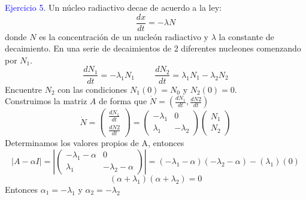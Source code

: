 \textcolor{blue}{Ejercicio 5.}
Un núcleo radiactivo decae de acuerdo a la ley:
\begin{equation*}
    \frac{dx}{dt}=-\lambda N
\end{equation*}
donde $N$ es la concentración de un nucleón radiactivo y $\lambda$ la constante de decaimiento. En una serie de decaimientos de 2 diferentes nucleones comenzando por $N_{1}$.
\begin{equation*}
    \frac{dN_{1}}{dt}=-\lambda_{1}N_{1} \hspace{1cm} \frac{dN_{2}}{dt}=\lambda_{1}N_{1}-\lambda_{2}N_{2}
\end{equation*}
Encuentre $N_{2}$ con las condiciones $N_{1}(0)=N_{0}$ y $N_{2}(0)=0$. \\

Construimos la matriz $A$ de forma que $\dot N=(\frac{dN_{1}}{dt},\frac{dN{2}}{dt})$
\begin{equation*}
\dot N =
    \begin{pmatrix}
    \frac{dN_{1}}{dt} \\
    \frac{dN{2}}{dt}
    \end{pmatrix}
    =
    \begin{pmatrix}
    -\lambda_{1} & 0 \\
    \lambda_{1} & -\lambda_{2}
    \end{pmatrix}
    \begin{pmatrix}
    N_{1} \\
    N_{2}
    \end{pmatrix}
\end{equation*}
Determinamos los valores propios de A, entonces
\begin{equation*}
     |A - \alpha I| = 
     \left|\begin{pmatrix}
     -\lambda_{1} - \alpha & 0 \\
    \lambda_{1} & -\lambda_{2} - \alpha
     \end{pmatrix}\right |
     =(-\lambda_{1} - \alpha )(-\lambda_{2} - \alpha)-(\lambda_{1})(0)
\end{equation*}
\begin{equation*}
    (\alpha +\lambda_{1})(\alpha + \lambda_{2})=0
\end{equation*}
Entonces $\alpha_{1}=-\lambda_{1}$ y $\alpha_{2}=-\lambda_{2}$


